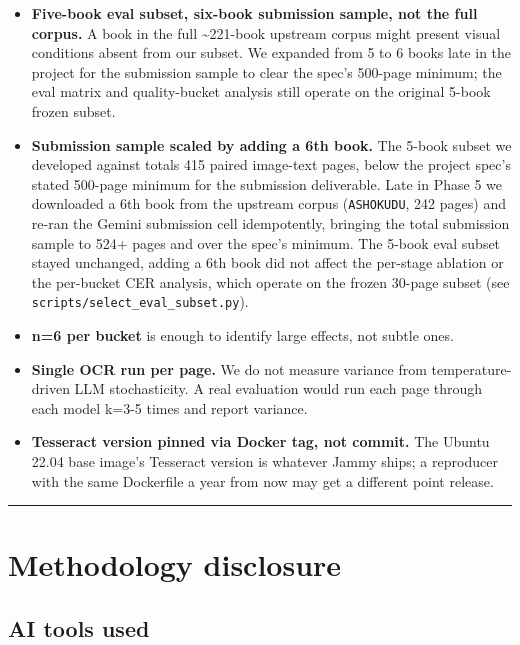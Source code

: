 \documentclass[
  letterpaper,
  DIV=11,
  numbers=noendperiod]{scrartcl}
\providecommand{\tightlist}{%
  \setlength{\itemsep}{0pt}\setlength{\parskip}{0pt}}
\begin{document}
\begin{itemize}
\tightlist
\item
  \textbf{Five-book eval subset, six-book submission sample, not the
  full corpus.} A book in the full \textasciitilde221-book upstream
  corpus might present visual conditions absent from our subset. We
  expanded from 5 to 6 books late in the project for the submission
  sample to clear the spec's 500-page minimum; the eval matrix and
  quality-bucket analysis still operate on the original 5-book frozen
  subset.
\item
  \textbf{Submission sample scaled by adding a 6th book.} The 5-book
  subset we developed against totals 415 paired image-text pages, below
  the project spec's stated 500-page minimum for the submission
  deliverable. Late in Phase 5 we downloaded a 6th book from the
  upstream corpus (\texttt{ASHOKUDU}, 242 pages) and re-ran the Gemini
  submission cell idempotently, bringing the total submission sample to
  524+ pages and over the spec's minimum. The 5-book eval subset stayed
  unchanged, adding a 6th book did not affect the per-stage ablation or
  the per-bucket CER analysis, which operate on the frozen 30-page
  subset (see \texttt{scripts/select\_eval\_subset.py}).
\item
  \textbf{n=6 per bucket} is enough to identify large effects, not
  subtle ones.
\item
  \textbf{Single OCR run per page.} We do not measure variance from
  temperature-driven LLM stochasticity. A real evaluation would run each
  page through each model k=3-5 times and report variance.
\item
  \textbf{Tesseract version pinned via Docker tag, not commit.} The
  Ubuntu 22.04 base image's Tesseract version is whatever Jammy ships; a
  reproducer with the same Dockerfile a year from now may get a
  different point release.
\end{itemize}

\begin{center}\rule{0.5\linewidth}{0.5pt}\end{center}

\section{Methodology disclosure}\label{methodology-disclosure}

\subsection{AI tools used}\label{ai-tools-used}
\end{document}
